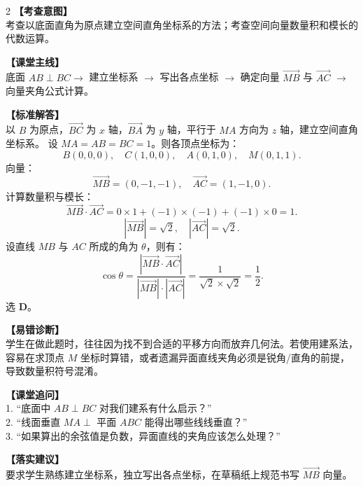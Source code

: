 \documentclass[11pt,a4paper]{ctexart}
\begin{document}
\par\vspace{0.8em}\vspace{0.8em}

\newpage


\mcfigurequestion{\qTJWPyramidSkewAngleStem}{\qTJWPyramidSkewAngleOptions}{\qTJWPyramidSkewAngleFigure[1.0]}

\vspace{0.8em}

\begin{paracol}{2}
  \textbf{【考查意图】}\\
  考查以底面直角为原点建立空间直角坐标系的方法；考查空间向量数量积和模长的代数运算。
  
  \textbf{【课堂主线】}\\
  底面 $AB \perp BC \to$ 建立坐标系 $\to$ 写出各点坐标 $\to$ 确定向量 $\overrightarrow{MB}$ 与 $\overrightarrow{AC}$ $\to$ 向量夹角公式计算。
  
  \textbf{【标准解答】}\\
  以 $B$ 为原点，$\overrightarrow{BC}$ 为 $x$ 轴，$\overrightarrow{BA}$ 为 $y$ 轴，平行于 $MA$ 方向为 $z$ 轴，建立空间直角坐标系。
  设 $MA=AB=BC=1$。则各顶点坐标为：
  \[ B(0,0,0),\quad C(1,0,0),\quad A(0,1,0),\quad M(0,1,1). \]
  向量：
  \[ \overrightarrow{MB} = (0, -1, -1),\quad \overrightarrow{AC} = (1, -1, 0). \]
  计算数量积与模长：
  \[ \overrightarrow{MB} \cdot \overrightarrow{AC} = 0\times 1 + (-1)\times(-1) + (-1)\times 0 = 1. \]
  \[ |\overrightarrow{MB}| = \sqrt{2},\quad |\overrightarrow{AC}| = \sqrt{2}. \]
  设直线 $MB$ 与 $AC$ 所成的角为 $\theta$，则有：
  \[ \cos\theta = \frac{|\overrightarrow{MB} \cdot \overrightarrow{AC}|}{|\overrightarrow{MB}| \cdot |\overrightarrow{AC}|} = \frac{1}{\sqrt{2}\times\sqrt{2}} = \frac{1}{2}. \]
  选 \textbf{D}。

  \switchcolumn
  \textbf{【易错诊断】}\\
  学生在做此题时，往往因为找不到合适的平移方向而放弃几何法。若使用建系法，容易在求顶点 $M$ 坐标时算错，或者遗漏异面直线夹角必须是锐角/直角的前提，导致数量积符号混淆。
  
  \textbf{【课堂追问】}\\
  1. “底面中 $AB \perp BC$ 对我们建系有什么启示？”\\
  2. “线面垂直 $MA \perp$ 平面 $ABC$ 能得出哪些线线垂直？”\\
  3. “如果算出的余弦值是负数，异面直线的夹角应该怎么处理？”
  
  \textbf{【落实建议】}\\
  要求学生熟练建立坐标系，独立写出各点坐标，在草稿纸上规范书写 $\overrightarrow{MB}$ 向量。
\end{paracol}
\end{document}

